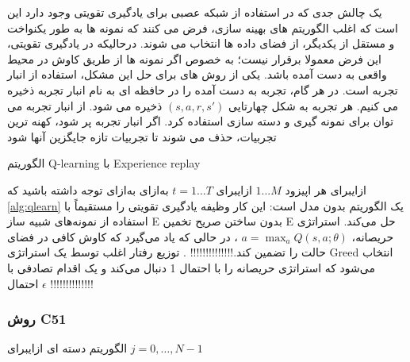 یک چالش جدی که در استفاده از شبکه عصبی برای یادگیری تقویتی وجود دارد این است که اغلب الگوریتم های بهینه سازی، فرض می کنند که نمونه ها به طور یکنواخت و مستقل از یکدیگر، از فضای داده ها انتخاب می شوند. درحالیکه در یادگیری تقویتی، این فرض معمولا برقرار نیست؛ به خصوص اگر نمونه ها از طریق کاوش در محیط واقعی به دست آمده باشد. یکی از روش های برای حل این مشکل، استفاده از انبار تجربه است. در هر گام، تجربه به دست آمده را در حافظه ای به نام انبار تجربه ذخیره می کنیم. هر تجربه به شکل چهارتایی $(s,a,r,s')$ ذخیره می شود. از انبار تجربه می توان برای نمونه گیری و دسته  سازی استفاده کرد. اگر انبار تجربه پر شود، کهنه ترین تجربیات، حذف می شوند تا تجربیات تازه جایگزین آنها شود
 
{الگوریتم Q-learning با Experience replay}

‌ازای{برای هر اپیزود 
$1...M$}
‌ازای{برای $t=1...T$}
  ‌به‌ازای
‌به‌ازای
\label{alg:qlearn}
توجه داشته باشید که \ref{alg:qlearn} یک الگوریتم بدون مدل است: این کار وظیفه یادگیری تقویتی را مستقیماً با استفاده از نمونه‌های شبیه ساز E بدون ساختن صریح تخمین E حل می‌کند.
 استراتژی حریصانه،
 $a = \max_{a} Q(s, a; \theta)$
 ، در حالی که یاد می‌گیرد که
کاوش کافی در فضای حالت را تضمین کند.!!!!!!!!!!!!!! . توزیع رفتار اغلب توسط یک استراتژی Greed انتخاب می‌شود که استراتژی حریصانه را با احتمال 1 دنبال می‌کند و یک
اقدام تصادفی با احتمال $\epsilon$
!!!!!!!!!!!!!!
\subsubsection{روش C51 }
{الگوریتم دسته ای}
‌ازای{برای 
	$j = 0,\dots,N-1$
}

